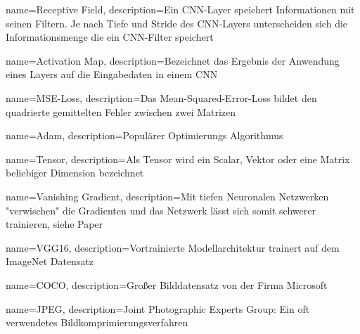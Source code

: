 {
	name={Receptive Field},
	description={Ein CNN-Layer speichert Informationen mit seinen Filtern. Je nach Tiefe und Stride des CNN-Layers unterscheiden sich die Informationsmenge die ein CNN-Filter speichert}
}

{
	name={Activation Map},
	description={Bezeichnet das Ergebnis der Anwendung eines Layers auf die Eingabedaten in einem CNN}
}

{
	name={MSE-Loss},
	description={Das Mean-Squared-Error-Loss bildet den quadrierte gemittelten Fehler zwischen zwei Matrizen}
}

{
	name={Adam},
	description={Populärer Optimierungs Algorithmus \cite{kingma2015adam}}
}


{
	name={Tensor},
	description={Als Tensor wird ein Scalar, Vektor oder eine Matrix beliebiger Dimension bezeichnet}
}

{
	name={Vanishing Gradient},
	description={Mit tiefen Neuronalen Netzwerken "verwischen" die Gradienten und das Netzwerk lässt sich somit schwerer trainieren, siehe Paper \cite{DBLP:journals/corr/HeZRS15}}
}

{
	name={VGG16},
	description={Vortrainierte Modellarchitektur trainert auf dem ImageNet Datensatz}
}

{
	name={COCO},
	description={Großer Bilddatensatz von der Firma Microsoft \cite{DBLP:journals/corr/LinMBHPRDZ14}}
}

{
	name={JPEG},
	description={Joint Photographic Experts Group: Ein oft verwendetes Bildkomprimierungsverfahren}
}